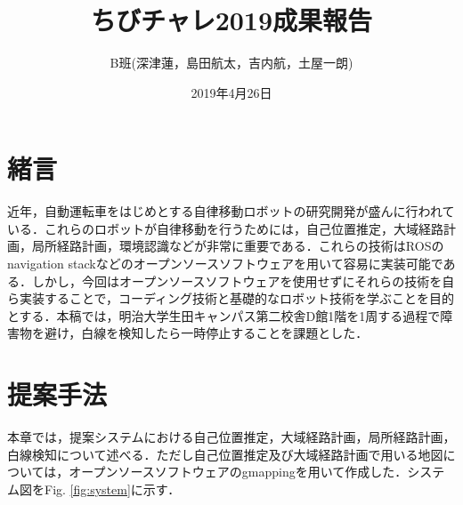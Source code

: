 \documentclass{jarticle}
\renewcommand{\%}{\textsf{\char`\%}}
\begin{document}
\title{ちびチャレ2019成果報告}
\author{B班(深津蓮，島田航太，吉内航，土屋一朗)}
\date{2019年4月26日}
\maketitle
\section{緒言}
近年，自動運転車をはじめとする自律移動ロボットの研究開発が盛んに行われている．これらのロボットが自律移動を行うためには，自己位置推定，大域経路計画，局所経路計画，環境認識などが非常に重要である．これらの技術はROSのnavigation stack\cite{ns}などのオープンソースソフトウェアを用いて容易に実装可能である．しかし，今回はオープンソースソフトウェアを使用せずにそれらの技術を自ら実装することで，コーディング技術と基礎的なロボット技術を学ぶことを目的とする．本稿では，明治大学生田キャンパス第二校舎D館1階を1周する過程で障害物を避け，白線を検知したら一時停止することを課題とした．
\section{提案手法}
本章では，提案システムにおける自己位置推定，大域経路計画，局所経路計画，白線検知について述べる．ただし自己位置推定及び大域経路計画で用いる地図については，オープンソースソフトウェアのgmapping\cite{gmapping}を用いて作成した．システム図をFig. \ref{fig:system}に示す．
\end{document}
